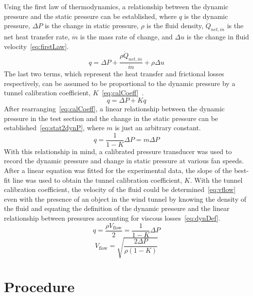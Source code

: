 \documentclass[journal,letterpaper]{IEEEtran}
\begin{document}
Using the first law of thermodynamics, a relationship between the dynamic pressure and the static pressure can be established, where $q$ is the dynamic pressure, $\Delta P$ is the change in static pressure, $\rho$ is the fluid density, $\dot{Q}_{net,in}$ is the net heat transfer rate, $\dot{m}$ is the mass rate of change, and $\Delta u$ is the change in fluid velocity~\eqref{eq:firstLaw}.
\begin{equation} \label{eq:firstLaw}
    q = \Delta P + \frac{\rho \dot{Q}_{net,in}}{\dot{m}} + \rho\Delta u
\end{equation}
The last two terms, which represent the heat transfer and frictional losses respectively, can be assumed to be proportional to the dynamic pressure by a tunnel calibration coefficient, $K$~\eqref{eq:calCoeff}~\cite{lecture}.
\begin{equation} \label{eq:calCoeff}
    q = \Delta P + Kq
\end{equation}
After rearranging~\eqref{eq:calCoeff}, a linear relationship between the dynamic pressure in the test section and the change in the static pressure can be established~\eqref{eq:stat2dynP}, where $m$ is just an arbitrary constant.
\begin{equation} \label{eq:stat2dynP}
    q = \frac{1}{1 - K}\Delta P = m\Delta P
\end{equation}
With this relationship in mind, a calibrated pressure transducer was used to record the dynamic pressure and change in static pressure at various fan speeds.
After a linear equation was fitted for the experimental data, the slope of the best-fit line was used to obtain the tunnel calibration coefficient, $K$.
With the tunnel calibration coefficient, the velocity of the fluid could be determined~\eqref{eq:vflow} even with the presence of an object in the wind tunnel by knowing the density of the fluid and equating the definition of the dynamic pressure and the linear relationship between pressures accounting for viscous losses~\eqref{eq:dynDef}.
\begin{equation} \label{eq:dynDef}
    q = \frac{\rho V_\text{flow}}{2} = \frac{1}{1 - K}\Delta P
\end{equation}
\begin{equation} \label{eq:vflow}
    V_\text{flow} = \sqrt{\frac{2\Delta P}{\rho(1 - K)}}
\end{equation}

\section{Procedure}
\end{document}
